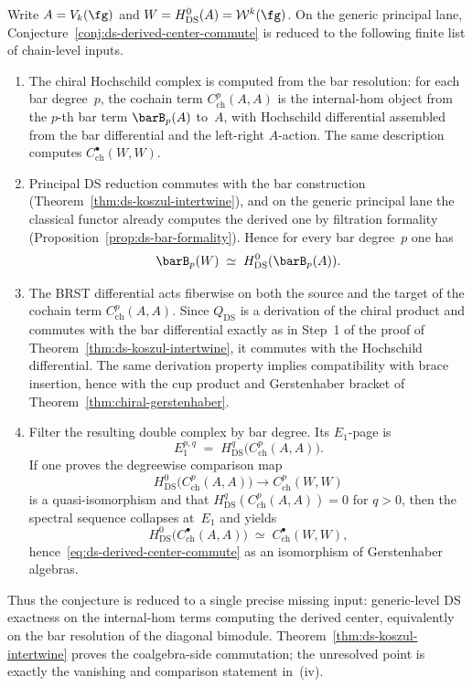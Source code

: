 \begin{remark}
\label{rem:ds-derived-center-evidence}
Write $A = V_k(\fg)$ and
$W = H^0_{\mathrm{DS}}(A) = \mathcal{W}^k(\fg)$.
On the generic principal lane, Conjecture~\ref{conj:ds-derived-center-commute}
is reduced to the following finite list of chain-level inputs.
\begin{enumerate}[label=\textup{(\roman*)}]
\item The chiral Hochschild complex is computed from the bar
 resolution: for each bar degree~$p$, the cochain term
 $C^p_{\mathrm{ch}}(A,A)$ is the internal-hom object from the
 $p$-th bar term $\barB_p(A)$ to~$A$, with Hochschild differential
 assembled from the bar differential and the left-right
 $A$-action. The same description computes
 $C^\bullet_{\mathrm{ch}}(W,W)$.
\item Principal DS reduction commutes with the bar construction
 (Theorem~\ref{thm:ds-koszul-intertwine}), and on the generic
 principal lane the classical functor already computes the
 derived one by filtration formality
 (Proposition~\ref{prop:ds-bar-formality}). Hence for every
 bar degree~$p$ one has
 \[
 \barB_p(W)
 \;\simeq\;
 H^0_{\mathrm{DS}}(\barB_p(A)).
 \]
\item The BRST differential acts fiberwise on both the source
 and the target of the cochain term
 $C^p_{\mathrm{ch}}(A,A)$. Since $Q_{\mathrm{DS}}$ is a derivation
 of the chiral product and commutes with the bar differential
 exactly as in Step~1 of the proof of
 Theorem~\ref{thm:ds-koszul-intertwine}, it commutes with the
 Hochschild differential. The same derivation property implies
 compatibility with brace insertion, hence with the cup product
 and Gerstenhaber bracket of
 Theorem~\ref{thm:chiral-gerstenhaber}.
\item Filter the resulting double complex by bar degree. Its
 $E_1$-page is
 \[
 E_1^{p,q}
 \;=\;
 H^q_{\mathrm{DS}}\!\bigl(C^p_{\mathrm{ch}}(A,A)\bigr).
 \]
 If one proves the degreewise comparison map
 \[
 H^0_{\mathrm{DS}}\!\bigl(C^p_{\mathrm{ch}}(A,A)\bigr)
 \longrightarrow
 C^p_{\mathrm{ch}}(W,W)
 \]
 is a quasi-isomorphism and that
 $H^q_{\mathrm{DS}}(C^p_{\mathrm{ch}}(A,A)) = 0$ for
 $q > 0$, then the spectral sequence collapses at~$E_1$ and yields
 \[
 H^0_{\mathrm{DS}}\!\bigl(C^\bullet_{\mathrm{ch}}(A,A)\bigr)
 \;\simeq\;
 C^\bullet_{\mathrm{ch}}(W,W),
 \]
 hence~\eqref{eq:ds-derived-center-commute} as an isomorphism of
 Gerstenhaber algebras.
\end{enumerate}
Thus the conjecture is reduced to a single precise missing input:
generic-level DS exactness on the internal-hom terms computing the
derived center, equivalently on the bar resolution of the diagonal
bimodule. Theorem~\ref{thm:ds-koszul-intertwine} proves the
coalgebra-side commutation; the unresolved point is exactly the
vanishing and comparison statement in~\textup{(}iv\textup{)}.
\end{remark}

